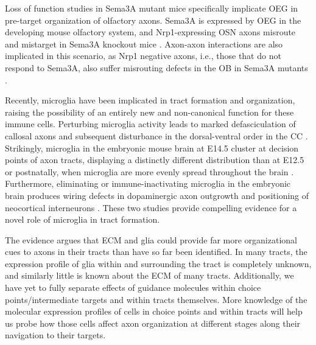 Loss of function studies in Sema3A mutant mice specifically implicate OEG in pre-target organization of olfactory axons.
Sema3A is expressed by OEG in the developing mouse olfactory system, and Nrp1-expressing OSN axons misroute and mistarget in Sema3A knockout mice \cite{schwarting2000semaphorin}.
Axon-axon interactions are also implicated in this scenario, as Nrp1 negative axons, i.e., those that do not respond to Sema3A, also suffer misrouting defects in the OB in Sema3A mutants \cite{schwarting2000semaphorin}.

Recently, microglia have been implicated in tract formation and organization, raising the possibility of an entirely new and non-canonical function for these immune cells.
Perturbing microglia activity leads to marked defasciculation of callosal axons and subsequent disturbance in the dorsal-ventral order in the CC \cite{pont2014microglia}.
Strikingly, microglia in the embryonic mouse brain at E14.5 cluster at decision points of axon tracts, displaying a distinctly different distribution than at E12.5 or postnatally, when microglia are more evenly spread throughout the brain \cite{squarzoni2014microglia}.
Furthermore, eliminating or immune-inactivating microglia in the embryonic brain produces wiring defects in dopaminergic axon outgrowth and positioning of neocortical interneurons \cite{squarzoni2014microglia}.
These two studies provide compelling evidence for a novel role of microglia in tract formation.

The evidence argues that ECM and glia could provide far more organizational cues to axons in their tracts than have so far been identified.
In many tracts, the expression profile of glia within and surrounding the tract is completely unknown, and similarly little is known about the ECM of many tracts.
Additionally, we have yet to fully separate effects of guidance molecules within choice points/intermediate targets and within tracts themselves.
More knowledge of the molecular expression profiles of cells in choice points and within tracts will help us probe how those cells affect axon organization at different stages along their navigation to their targets.